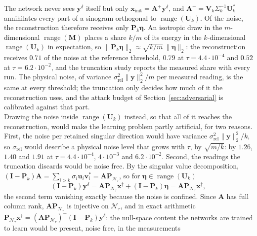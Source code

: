 \documentclass{article}
\numberwithin{equation}{section}
\begin{document}
The network never sees $\mathbf{y}^\delta$ itself but only $\mathbf{x}_\text{init}=\mathbf{A}^{+}\mathbf{y}^\delta$,
and $\mathbf{A}^{+}=\mathbf{V}_k\Sigma_k^{-1}\mathbf{U}_k^{*}$ annihilates every part of a sinogram orthogonal
to $\operatorname{range}(\mathbf{U}_k)$. Of the noise, the reconstruction therefore receives only
$\mathbf{P}_k\boldsymbol{\eta}$. An isotropic draw in the $m$-dimensional $\operatorname{range}(\mathbf{M})$
places a share $k/m$ of its energy in the $k$-dimensional $\operatorname{range}(\mathbf{U}_k)$ in
expectation, so $\lVert\mathbf{P}_k\boldsymbol{\eta}\rVert_2\approx\sqrt{k/m}\,\lVert\boldsymbol{\eta}\rVert_2$:
the reconstruction receives $0.71$ of the noise at the reference threshold, $0.79$ at
$\tau=4.4\cdot10^{-4}$ and $0.52$ at $\tau=6.2\cdot10^{-2}$, and the truncation study reports the measured
share with every run. The physical noise, of variance $\sigma_\text{rel}^2\lVert\mathbf{y}\rVert_2^2/m$ per
measured reading, is the same at every threshold; the truncation only decides how much of it the
reconstruction uses, and the attack budget of Section~\ref{sec:adversarial} is calibrated against that part.\\
Drawing the noise inside $\operatorname{range}(\mathbf{U}_k)$ instead, so that all of it reaches the
reconstruction, would make the learning problem partly artificial, for two reasons. First, the noise per
retained singular direction would have variance $\sigma_\text{rel}^2\lVert\mathbf{y}\rVert_2^2/k$, so
$\sigma_\text{rel}$ would describe a physical noise level that grows with $\tau$, by $\sqrt{m/k}$: by
$1.26$, $1.40$ and $1.91$ at $\tau=4.4\cdot10^{-4}$, $4\cdot10^{-3}$ and $6.2\cdot10^{-2}$. Second, the readings
the truncation discards would be noise free. By the singular value decomposition,
$(\mathbf{I}-\mathbf{P}_k)\mathbf{A}=\sum_{i>k}\sigma_i\mathbf{u}_i\mathbf{v}_i^{*}=\mathbf{A}\mathbf{P}_{\mathcal{N}_\tau}$,
so for $\boldsymbol{\eta}\in\operatorname{range}(\mathbf{U}_k)$
\[(\mathbf{I}-\mathbf{P}_k)\mathbf{y}^\delta=\mathbf{A}\mathbf{P}_{\mathcal{N}_\tau}\mathbf{x}^\dagger
+(\mathbf{I}-\mathbf{P}_k)\boldsymbol{\eta}=\mathbf{A}\mathbf{P}_{\mathcal{N}_\tau}\mathbf{x}^\dagger,\]
the second term vanishing exactly because the noise is confined. Since $\mathbf{A}$ has full column rank,
$\mathbf{A}\mathbf{P}_{\mathcal{N}_\tau}$ is injective on $\mathcal{N}_\tau$, and in exact arithmetic
$\mathbf{P}_{\mathcal{N}_\tau}\mathbf{x}^\dagger=(\mathbf{A}\mathbf{P}_{\mathcal{N}_\tau})^{+}(\mathbf{I}-\mathbf{P}_k)\mathbf{y}^\delta$:
the null-space content the networks are trained to learn would be present, noise free, in the measurements
\end{document}

